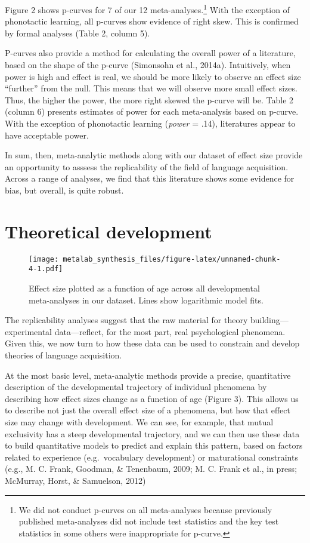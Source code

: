 \documentclass[english,floatsintext,man]{apa6}
\begin{document}
Figure 2 shows p-curves for 7 of our 12
meta-analyses.\footnote{We did not conduct p-curves on all meta-analyses because previously published meta-analyses did not include test statistics and the key test statistics in some others were inappropriate for p-curve. }
With the exception of phonotactic learning, all p-curves show evidence
of right skew. This is confirmed by formal analyses (Table 2, column 5).

P-curves also provide a method for calculating the overall power of a
literature, based on the shape of the p-curve (Simonsohn et al., 2014a).
Intuitively, when power is high and effect is real, we should be more
likely to observe an effect size \enquote{further} from the null. This
means that we will observe more small effect sizes. Thus, the higher the
power, the more right skewed the p-curve will be. Table 2 (column 6)
presents estimates of power for each meta-analysis based on p-curve.
With the exception of phonotactic learning (\emph{power} = .14),
literatures appear to have acceptable power.

In sum, then, meta-analytic methods along with our dataset of effect
size provide an opportunity to asssess the replicability of the field of
language acquisition. Across a range of analyses, we find that this
literature shows some evidence for bias, but overall, is quite robust.

\section{Theoretical development}\label{theoretical-development}

\begin{figure}[htbp]
\centering
\texttt{[image: metalab\_synthesis\_files/figure-latex/unnamed-chunk-4-1.pdf]}
\caption{Effect size plotted as a function of age across all
developmental meta-analyses in our dataset. Lines show logarithmic model
fits.}
\end{figure}

The replicability analyses suggest that the raw material for theory
building---experimental data---reflect, for the most part, real
psychological phenomena. Given this, we now turn to how these data can
be used to constrain and develop theories of language acquisition.

At the most basic level, meta-analytic methods provide a precise,
quantitative description of the developmental trajectory of individual
phenomena by describing how effect sizes change as a function of age
(Figure 3). This allows us to describe not just the overall effect size
of a phenomena, but how that effect size may change with development. We
can see, for example, that mutual exclusivity has a steep developmental
trajectory, and we can then use these data to build quantitative models
to predict and explain this pattern, based on factors related to
experience (e.g.~vocabulary development) or maturational constraints
(e.g., M. C. Frank, Goodman, \& Tenenbaum, 2009; M. C. Frank et al., in
press; McMurray, Horst, \& Samuelson, 2012)
\end{document}
